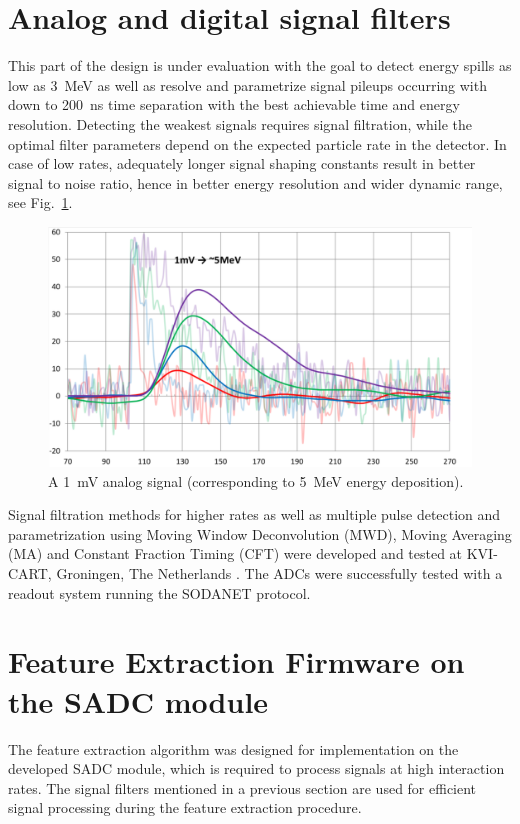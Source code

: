 \documentclass[12pt,a4paper, twocolumn]{article}
\newcommand{\Reffig}[1]{Fig.~\ref{#1}}
\begin{document}
\section{Analog and digital signal filters}
This part of the design is under evaluation with the goal to detect energy spills as low as \SI{3}{\mega\electronvolt} as well as resolve and parametrize signal pileups occurring with down to \SI{200}{\nano\second} time separation with the best achievable time and energy resolution.
Detecting the weakest signals requires signal filtration, while the optimal filter parameters depend on the expected particle rate in the detector. In case of low rates, adequately longer signal shaping constants result in better signal to noise ratio, hence in better energy resolution and wider dynamic range, see \Reffig{fig:sadc:filter}. 
\begin{figure}[htb]
\includegraphics[width=\linewidth, trim={3 3 0 0}, clip]{fig/ADCfilter.pdf}
\caption{A \SI{1}{\milli\volt} analog signal (corresponding to \SI{5}{\mega\electronvolt} energy deposition). }
\label{fig:sadc:filter}
\end{figure}
Signal filtration methods for higher rates as well as multiple pulse detection and parametrization using Moving Window Deconvolution (MWD), Moving Averaging (MA) and Constant Fraction Timing (CFT) were developed and tested at KVI-CART, Groningen, The Netherlands \cite{Tambave_2012}. 
The ADCs were successfully tested with a readout system running the SODANET protocol. 
\section{Feature Extraction Firmware on the SADC module}
The feature extraction algorithm was designed for implementation on the developed SADC module, which is required to process signals at high interaction rates. The signal filters mentioned in a previous section  are used for efficient signal processing during the feature extraction procedure. 
\end{document}

